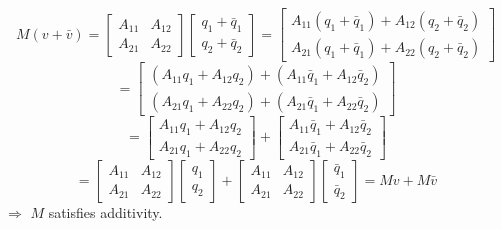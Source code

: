\documentclass[fleqn]{article}
\begin{document}
\begin{enumerate}[nolistsep]
\begin{enumerate}[nolistsep]
					\begin{equation*}
						M(v + \bar{v}) = \begin{bmatrix} A_{11} & A_{12} \\ A_{21} & A_{22}\end{bmatrix}\begin{bmatrix} q_1 + \bar{q}_1 \\ q_2 + \bar{q}_2 \end{bmatrix} = \begin{bmatrix} A_{11}(q_1 + \bar{q}_1) + A_{12}(q_2 + \bar{q}_2) \\ A_{21}(q_1 + \bar{q}_1) + A_{22}(q_2 + \bar{q}_2) \end{bmatrix}
					\end{equation*}
					\begin{equation*}
						= \begin{bmatrix}(A_{11}q_1 + A_{12}q_2) + (A_{11}\bar{q}_1 + A_{12}\bar{q}_2) \\ (A_{21}q_1 + A_{22}q_2) + (A_{21}\bar{q}_1 + A_{22}\bar{q}_2)\end{bmatrix}
					\end{equation*}
					\begin{equation*}
						= \begin{bmatrix}A_{11}q_1 + A_{12}q_2 \\ A_{21}q_1 + A_{22}q_2 \end{bmatrix} + \begin{bmatrix}A_{11}\bar{q}_1 + A_{12}\bar{q}_2 \\ A_{21}\bar{q}_1 + A_{22}\bar{q}_2 \end{bmatrix}
					\end{equation*}
					\begin{equation*}
						= \begin{bmatrix}A_{11} & A_{12} \\ A_{21} & A_{22}\end{bmatrix}\begin{bmatrix}q_1 \\ q_2\end{bmatrix} +  \begin{bmatrix}A_{11} & A_{12} \\ A_{21} & A_{22}\end{bmatrix}\begin{bmatrix}\bar{q}_1 \\ \bar{q}_2\end{bmatrix} = Mv + M\bar{v}
					\end{equation*}
					$\Rightarrow$ $M$ satisfies additivity.
					

\end{enumerate}
\end{enumerate}
\end{document}
